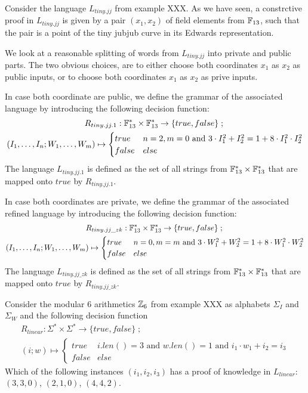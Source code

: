 \begin{example} Consider the language $L_{tiny.jj}$ from example XXX. As we have seen, a constrctive proof in $L_{tiny.jj}$ is given by a pair $(x_1,x_2)$ of field elements from $\mathbb{F}_{13}$, such that the pair is a point of the tiny jubjub curve in its Edwards representation.

We look at a reasonable splitting of words from $L_{tiny.jj}$ into private and public parts. The two obvious choices, are to either choose both coordinates $x_1$ as $x_2$ as public inputs, or to choose both coordinates $x_1$ as $x_2$ as prive inputs. 

In case both coordinate are public, we define the grammar of the associated language by introducing the following decision function:
\begin{multline*}
R_{tiny.jj.1} : \mathbb{F}_{13}^*\times \mathbb{F}_{13}^* \to \{true, false\}\;;\;\\
(I_1,\ldots,I_n;W_1,\ldots,W_m) \mapsto
\begin{cases}
true & n=2, m=0 \text{ and } 3\cdot I_1^2 + I_2^2 = 1+ 8\cdot I_1^2\cdot I_2^2\\
false & else
\end{cases}
\end{multline*}
The language $L_{tiny.jj.1}$ is defined as the set of all strings from $\mathbb{F}_{13}^*\times \mathbb{F}_{13}^*$ that are mapped onto $true$ by $R_{tiny.jj.1}$. 

In case both coordinates are private, we define the grammar of the associated refined language by introducing the following decision function:
\begin{multline*}
R_{tiny.jj\_zk} : \mathbb{F}_{13}^*\times \mathbb{F}_{13}^* \to \{true, false\}\;;\;\\
(I_1,\ldots,I_n;W_1,\ldots,W_m) \mapsto
\begin{cases}
true & n=0, m=m \text{ and } 3\cdot W_1^2 + W_2^2 = 1+ 8\cdot W_1^2\cdot W_2^2\\
false & else
\end{cases}
\end{multline*}
The language $L_{tiny.jj\_zk}$ is defined as the set of all strings from $\mathbb{F}_{13}^*\times \mathbb{F}_{13}^*$ that are mapped onto $true$ by $R_{tiny.jj\_zk}$. 
\end{example}
\begin{exercise} Consider the modular $6$ arithmetics $\mathbb{Z}_6$ from example XXX as alphabets $\Sigma_I$ and $\Sigma_W$ and the following decision function
\begin{multline*}
R_{linear} : \Sigma^* \times \Sigma^* \to \{true, false\}\;;\;\\
(i;w) \mapsto
\begin{cases}
true & i.len()=3 \text{ and } w.len()=1 \text{ and } i_1\cdot w_1 + i_2 = i_3\\
false & else
\end{cases}
\end{multline*}
Which of the following instances $(i_1,i_2,i_3)$ has a proof of knowledge in $L_{linear}$: $(3,3,0)$, $(2,1,0)$, $(4,4,2)$.
\end{exercise}
